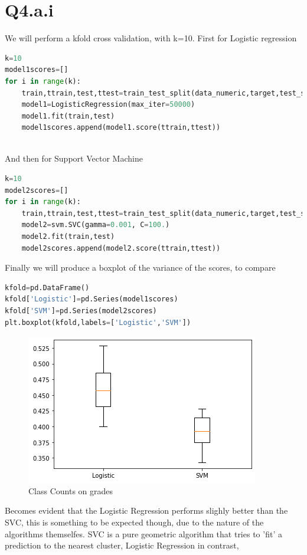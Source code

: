 \documentclass[openany]{article}
\begin{document}
		\section{Q4.a.i}
			We will perform a kfold cross validation, with k=10. First for Logistic regression
			\begin{lstlisting}[language=Python]
k=10
model1scores=[]
for i in range(k):
	train,ttrain,test,ttest=train_test_split(data_numeric,target,test_size=0.2,random_state=42+i)
	model1=LogisticRegression(max_iter=50000)
	model1.fit(train,test)
	model1scores.append(model1.score(ttrain,ttest))
	
			\end{lstlisting}
			And then for Support Vector Machine
			\begin{lstlisting}[language=Python]
k=10
model2scores=[]
for i in range(k):
	train,ttrain,test,ttest=train_test_split(data_numeric,target,test_size=0.2,random_state=42+i)
	model2=svm.SVC(gamma=0.001, C=100.)
	model2.fit(train,test)
	model2scores.append(model2.score(ttrain,ttest))
			\end{lstlisting}
			Finally we will produce a boxplot of the variance of the scores, to compare
			\begin{lstlisting}[language=Python]
kfold=pd.DataFrame()
kfold['Logistic']=pd.Series(model1scores)
kfold['SVM']=pd.Series(model2scores)
plt.boxplot(kfold,labels=['Logistic','SVM'])
			\end{lstlisting}
			\begin{figure}[H]
				\iftrue
				\centering
				\caption{Class Counts on grades}
				\includegraphics[scale=0.5]{q4-a-i-1}
				\fi
			\end{figure}
			Becomes evident that the Logistic Regression performs slighly better than the SVC, this is something to be expected though, due to the nature of the
			algorithms themselfes. SVC is a pure geometric algorithm that tries to 'fit' a prediction to the nearest cluster, Logistic Regression in contrast, 
\end{document}
